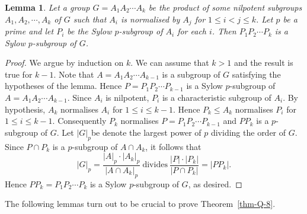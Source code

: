 \documentclass[12pt,a4paper]{article}
\DeclareMathOperator{\Z}{Z}
\DeclareMathOperator{\Fit}{F}
\newtheorem{lemma}[theorem]{Lemma}
\theoremstyle{definition}
\begin{document}



\begin{lemma}\label{lem-Sylow}
Let a group $G=A_1A_2\cdots A_k$ be the product of some nilpotent subgroups $A_1,A_2,\cdots,A_k$ of $G$ such that $A_i$ is normalised by $A_j$ for $1 \leq i<j \leq k$. Let $p$ be a prime and let $P_i$ be the Sylow $p$-subgroup of $A_i$ for each $i$. Then $P_1P_2\cdots P_k$ is a Sylow $p$-subgroup of $G$.
\end{lemma}
\begin{proof}
We argue by induction on $k$. We can assume that $k > 1$  and the result is true for $k-1$. Note that $A=A_1A_2\cdots A_{k-1}$ is a subgroup of $G$ satisfying the hypotheses of the lemma. Hence $P=P_1P_2\cdots P_{k-1}$ is a Sylow $p$-subgroup of $A=A_1A_2\cdots A_{k-1}$. Since $A_i$ is nilpotent, $P_i$ is a characteristic subgroup of $A_i$. By hypothesis, $A_k$ normalises $A_i$ for $1 \leq i \leq k-1$. Hence $P_k \leq A_k$ normalises $P_i$ for $1 \leq i \leq k-1$. Consequently $P_k$ normalises $P=P_1P_2\cdots P_{k-1}$ and $PP_k$ is a $p$-subgroup of $G$. Let $|G|_p$be denote the largest power of $p$ dividing the order of $G$. Since $P \cap P_k$ is a $p$-subgroup of $A \cap A_k$, it follows that
$$|G|_p=\frac{|A|_p\cdot |A_k|_p}{|A \cap A_k|_p}~\text{divides}~\frac{|P|\cdot |P_k|}{|P \cap P_k|}=|PP_k|.$$
Hence $PP_k=P_1P_2\cdots P_k$ is a Sylow $p$-subgroup of $G$, as desired.
\end{proof}

The following lemmas turn out to be crucial to prove Theorem~\ref{thm-Q-8}.
\end{document}
